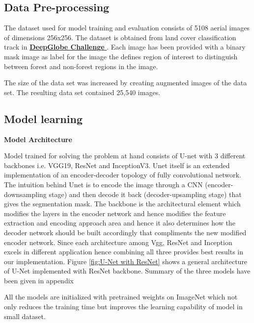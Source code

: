 \documentclass[rnd]{mas_proposal}
\begin{document}
\subsection{Data Pre-processing}

The dataset used for model training and evaluation consists of  5108 aerial images of dimensions 256x256. The dataset is obtained from land cover 
classification track in \href{https://www.kaggle.com/balraj98/deepglobe-land-cover-classification-dataset}{\textbf{DeepGlobe Challenge }}
. Each image has been provided with a binary mask image as label for the image the defines region of interest to distinguish between forest and non-forest regions 
in the image.

The size of the data set was increased by creating augmented images of the data set. The resulting data set contained 25,540 images. 

\subsection{Model learning}

\textbf{Model Architecture}
\vspace{20px}


Model trained for solving the problem at hand consists of U-net with 3 different backbones i.e. VGG19, ResNet and InceptionV3. Unet itself is an extended 
implementation of an encoder-decoder topology of  fully convolutional network. The intuition behind Unet is to encode the image through 
a CNN (encoder-downsampling stage) and then decode it back (decoder-upsampling stage) that gives the segmentation mask.  The backbone is the architectural
 element which modifies the layers in the encoder network and hence modifies the feature extraction and encoding approach area and hence it also determines how 
 the decoder network should be built accordingly that compliments the new modified encoder network.
Since each architecture among Vgg, ResNet and Inception excels in different application hence combining all three provides best results in our implementation. 
Figure \ref{fig:U-Net with ResNet} shows a general architecture of U-Net implemented with ResNet backbone. Summary of the three models have been given in appendix

All the models are initialized with pretrained weights on ImageNet which not only reduces the training time but improves the learning capability of model in small dataset. 
\end{document}

